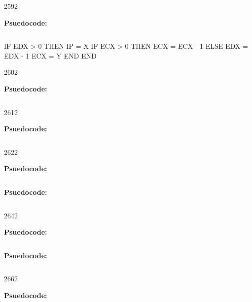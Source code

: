       {259}{2}

\textbf{Psuedocode:}
\begin{verbatim}
\end{verbatim}

IF EDX > 0 THEN\newline
  IP = X\newline
  IF ECX > 0 THEN\newline
    ECX = ECX - 1\newline
  ELSE\newline
    EDX = EDX - 1\newline
    ECX = Y\newline
  END\newline
END


        {260}{2}

\textbf{Psuedocode:}
\begin{verbatim}
\end{verbatim}


        {261}{2}

\textbf{Psuedocode:}
\begin{verbatim}
\end{verbatim}


        {262}{2}

\textbf{Psuedocode:}
\begin{verbatim}
\end{verbatim}



\textbf{Psuedocode:}
\begin{verbatim}
\end{verbatim}


      {264}{2}

\textbf{Psuedocode:}
\begin{verbatim}
\end{verbatim}



\textbf{Psuedocode:}
\begin{verbatim}
\end{verbatim}


  {266}{2}

\textbf{Psuedocode:}
\begin{verbatim}
\end{verbatim}


